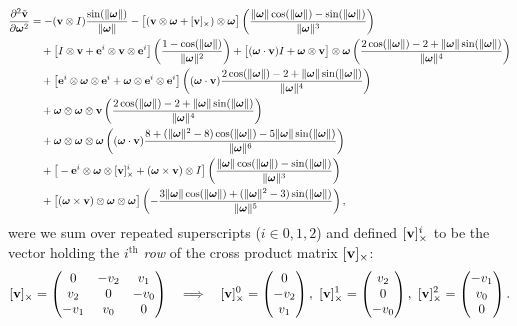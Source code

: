 \documentclass[10pt]{article}
\providecommand{\norm}[1]{\lVert#1\rVert}
\providecommand{\cross}{\times}
\renewcommand{\vec}[1]{{\bf #1}}
\def\w{\boldsymbol{\omega}}
\def\wn{\norm{\w}}
\def\v{\vec{v}}
\def\e{\vec{e}}
\begin{document}
\begin{align*}
\frac{\partial^2 \tilde{\v}}{\partial \w^2}
&=
    -(\v \otimes I)  \frac{\sin(\wn)}{\wn}
    - \big[(\v \otimes \w + [\v]_\cross) \otimes \w\big] \left(\frac{\wn \cos(\wn) - \sin(\wn)}{\wn^3}\right)
\\ &\quad
    + \big[ I \otimes \v + \e^i \otimes \v \otimes \e^i \big] \left(\frac{1 - \cos(\wn)}{\wn^2}\right)
    + \big[ (\w \cdot \v) I + \w \otimes \v \big] \otimes \w \left(\frac{2 \cos(\wn) - 2 + \wn \sin(\wn)}{\wn^4}\right)
\\ &\quad
    + \big[\e^i \otimes \w \otimes \e^i + \w \otimes \e^i \otimes \e^i\big] \left((\w \cdot \v) \frac{2 \cos(\wn) - 2 + \wn \sin(\wn)}{\wn^4}\right)
\\ &\quad
    + \w \otimes \w \otimes \v \left(\frac{2 \cos(\wn) - 2 + \wn \sin(\wn)}{\wn^4}\right)
\\ &\quad
    + \w \otimes \w \otimes \w \left((\w \cdot \v) \frac{8 + (\wn^2 - 8) \cos(\wn) - 5 \wn \sin(\wn)}{\wn^6}\right)
\\ &\quad
    + \big[-\e^i \otimes \w \otimes [\v]_\cross^i + (\w\cross\v) \otimes I \big] \left(\frac{\wn \cos(\wn) - \sin(\wn)}{\wn^3}\right)
\\ &\quad
    + \big[(\w \cross \v) \otimes \w \otimes \w\big]\left(-\frac{3 \wn \cos(\wn) + (\wn^2 - 3) \sin(\wn)}{\wn^5}\right),
\end{align*}
were we sum over repeated superscripts ($i \in {0, 1, 2}$) and defined $[\v]_\cross^i$ to be the vector holding the $i^\text{th}$
\emph{row} of the cross product matrix $[\v]_\cross$:
$$
[\v]_\cross =
\begin{pmatrix}
0 & -v_2 & v_1 \\
v_2 & 0 & -v_0 \\
-v_1 & v_0 & 0 \\
\end{pmatrix}
\quad \Longrightarrow \quad
[\v]_\cross^0 = \begin{pmatrix} 0 \\ -v_2 \\ v_1 \end{pmatrix},\,\,
[\v]_\cross^1 = \begin{pmatrix} v_2 \\ 0 \\ -v_0 \end{pmatrix},\,\,
[\v]_\cross^2 = \begin{pmatrix} -v_1 \\ v_0 \\ 0 \end{pmatrix}.
$$
\end{document}
